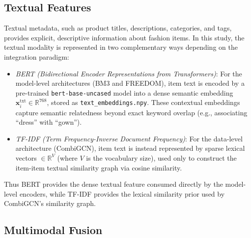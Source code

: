 \subsection{Textual Features}

Textual metadata, such as product titles, descriptions, categories, and tags, provides explicit, descriptive information about fashion items. In this study, the textual modality is represented in two complementary ways depending on the integration paradigm:
\begin{itemize}
    \item \textit{BERT (Bidirectional Encoder Representations from Transformers)}: For the model-level architectures (BM3 and FREEDOM), item text is encoded by a pre-trained \texttt{bert-base-uncased} model into a dense semantic embedding \(\mathbf{x}_i^{\text{txt}} \in \mathbb{R}^{768}\), stored as \texttt{text\_embeddings.npy}. These contextual embeddings capture semantic relatedness beyond exact keyword overlap (e.g., associating ``dress'' with ``gown'').
    \item \textit{TF-IDF (Term Frequency-Inverse Document Frequency)}: For the data-level architecture (CombiGCN), item text is instead represented by sparse lexical vectors \(\in \mathbb{R}^{V}\) (where \(V\) is the vocabulary size), used only to construct the item-item textual similarity graph via cosine similarity.
\end{itemize}
Thus BERT provides the dense textual feature consumed directly by the model-level encoders, while TF-IDF provides the lexical similarity prior used by CombiGCN's similarity graph.


\subsection{Multimodal Fusion}

